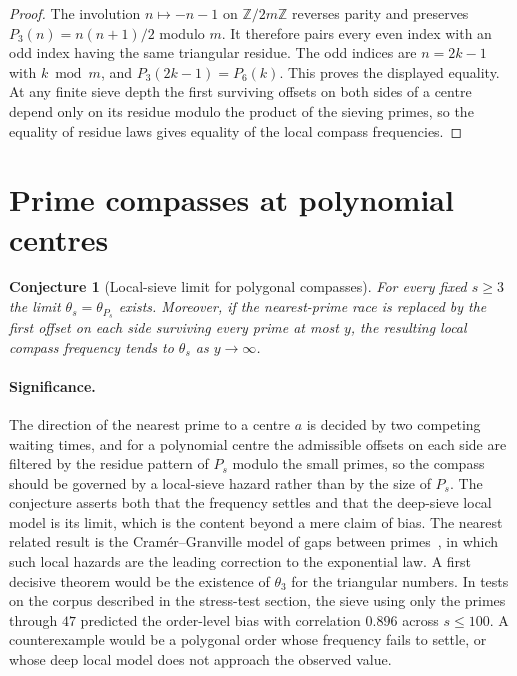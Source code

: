 \documentclass[11pt]{article}
\newtheorem{conjecture}{Conjecture}
\theoremstyle{definition}
\newcommand{\Z}{\mathbb Z}
\providecommand{\Z}{\mathbb Z}
\begin{document}
\begin{proof}
The involution $n\mapsto-n-1$ on $\Z/2m\Z$ reverses parity and preserves $P_3(n)=n(n+1)/2$ modulo $m$.  It therefore pairs every even index with an odd index having the same triangular residue.  The odd indices are $n=2k-1$ with $k\bmod m$, and $P_3(2k-1)=P_6(k)$.  This proves the displayed equality.  At any finite sieve depth the first surviving offsets on both sides of a centre depend only on its residue modulo the product of the sieving primes, so the equality of residue laws gives equality of the local compass frequencies.
\end{proof}

\section{Prime compasses at polynomial centres}

\begin{conjecture}[Local-sieve limit for polygonal compasses]\label{w1}
For every fixed $s\ge3$ the limit $\theta_s=\theta_{P_s}$ exists.  Moreover, if the nearest-prime race is replaced by the first offset on each side surviving every prime at most $y$, the resulting local compass frequency tends to $\theta_s$ as $y\to\infty$.
\end{conjecture}

\paragraph{Significance.}
The direction of the nearest prime to a centre $a$ is decided by two competing waiting times, and for a polynomial centre the admissible offsets on each side are filtered by the residue pattern of $P_s$ modulo the small primes, so the compass should be governed by a local-sieve hazard rather than by the size of $P_s$.  The conjecture asserts both that the frequency settles and that the deep-sieve local model is its limit, which is the content beyond a mere claim of bias.  The nearest related result is the Cramér--Granville model of gaps between primes~\cite{Granville}, in which such local hazards are the leading correction to the exponential law.  A first decisive theorem would be the existence of $\theta_3$ for the triangular numbers.  In tests on the corpus described in the stress-test section, the sieve using only the primes through $47$ predicted the order-level bias with correlation $0.896$ across $s\le100$.  A counterexample would be a polygonal order whose frequency fails to settle, or whose deep local model does not approach the observed value.
\end{document}
